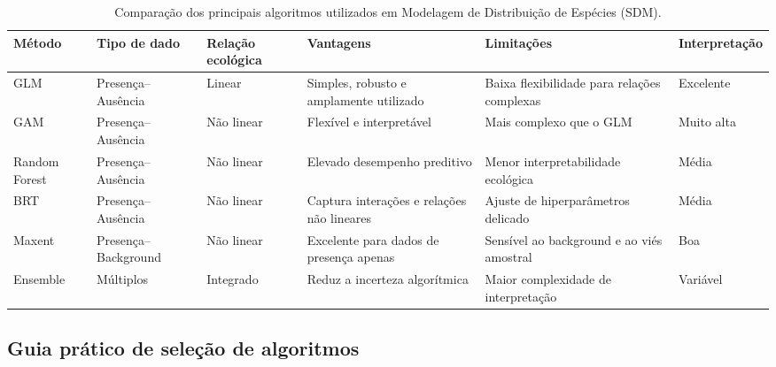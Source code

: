 \documentclass{ueap-sdm}
\begin{document}
\begin{table}[H]
	\centering
	\caption{Comparação dos principais algoritmos utilizados em Modelagem de Distribuição de Espécies (SDM).}
	\label{tab:comparacao_algoritmos_sdm}
	
	\scriptsize
	
	\begin{tabular}{
			p{}
			p{}
			p{}
			p{}
			p{}
			p{}
		}
		
		\toprule
		\textbf{Método} &
		\textbf{Tipo de dado} &
		\textbf{Relação ecológica} &
		\textbf{Vantagens} &
		\textbf{Limitações} &
		\textbf{Interpretação} \\
		\midrule
		
		GLM &
		Presença--Ausência &
		Linear &
		Simples, robusto e amplamente utilizado &
		Baixa flexibilidade para relações complexas &
		Excelente \\
		
		GAM &
		Presença--Ausência &
		Não linear &
		Flexível e interpretável &
		Mais complexo que o GLM &
		Muito alta \\
		
		Random Forest &
		Presença--Ausência &
		Não linear &
		Elevado desempenho preditivo &
		Menor interpretabilidade ecológica &
		Média \\
		
		BRT &
		Presença--Ausência &
		Não linear &
		Captura interações e relações não lineares &
		Ajuste de hiperparâmetros delicado &
		Média \\
		
		Maxent &
		Presença--Background &
		Não linear &
		Excelente para dados de presença apenas &
		Sensível ao background e ao viés amostral &
		Boa \\
		
		Ensemble &
		Múltiplos &
		Integrado &
		Reduz a incerteza algorítmica &
		Maior complexidade de interpretação &
		Variável \\
		
		\bottomrule
		
	\end{tabular}
	
\end{table}

\subsection*{Guia prático de seleção de algoritmos}
\end{document}
